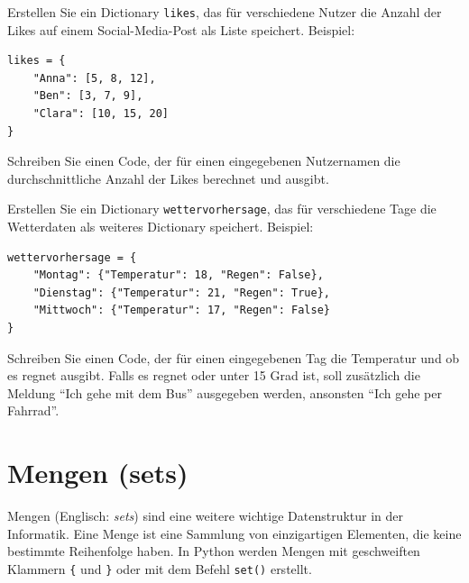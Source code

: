 \begin{myexercise}
	Erstellen Sie ein Dictionary \lstinline|likes|, das für verschiedene Nutzer die Anzahl der Likes auf einem Social-Media-Post als Liste speichert. Beispiel:
	\begin{lstlisting}
likes = {
	"Anna": [5, 8, 12],
	"Ben": [3, 7, 9],
	"Clara": [10, 15, 20]
}
\end{lstlisting}
	Schreiben Sie einen Code, der für einen eingegebenen Nutzernamen die durchschnittliche Anzahl der Likes berechnet und ausgibt.
	\begin{myanswer}
		
	\end{myanswer}
\end{myexercise}

\begin{myexercise}
	Erstellen Sie ein Dictionary \lstinline|wettervorhersage|, das für verschiedene Tage die Wetterdaten als weiteres Dictionary speichert. Beispiel:
	\begin{lstlisting}
wettervorhersage = {
	"Montag": {"Temperatur": 18, "Regen": False},
	"Dienstag": {"Temperatur": 21, "Regen": True},
	"Mittwoch": {"Temperatur": 17, "Regen": False}
}
\end{lstlisting}
	Schreiben Sie einen Code, der für einen eingegebenen Tag die Temperatur und ob es regnet ausgibt. Falls es regnet oder unter 15 Grad ist, soll zusätzlich die Meldung \enquote{Ich gehe mit dem Bus} ausgegeben werden, ansonsten \enquote{Ich gehe per Fahrrad}.
	\begin{myanswer}
		
	\end{myanswer}
\end{myexercise}

\clearpage
\section{Mengen (sets)}
Mengen (Englisch: \textit{sets}) sind eine weitere wichtige Datenstruktur in der Informatik. Eine Menge ist eine Sammlung von einzigartigen Elementen, die keine bestimmte Reihenfolge haben. In Python werden Mengen mit geschweiften Klammern \lstinline|{| und \lstinline|}| oder mit dem Befehl \lstinline|set()| erstellt.

